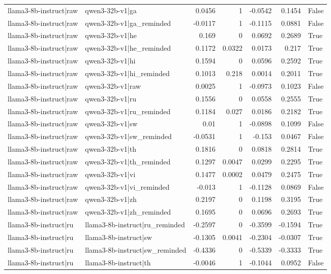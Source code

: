 \begin{table}
\begin{tabular}{l l r r r r l}
llama3-8b-instruct|raw & qwen3-32b-v1|ga & 0.0456 & 1 & -0.0542 & 0.1454 & False \\
llama3-8b-instruct|raw & qwen3-32b-v1|ga_reminded & -0.0117 & 1 & -0.1115 & 0.0881 & False \\
llama3-8b-instruct|raw & qwen3-32b-v1|he & 0.169 & 0 & 0.0692 & 0.2689 & True \\
llama3-8b-instruct|raw & qwen3-32b-v1|he_reminded & 0.1172 & 0.0322 & 0.0173 & 0.217 & True \\
llama3-8b-instruct|raw & qwen3-32b-v1|hi & 0.1594 & 0 & 0.0596 & 0.2592 & True \\
llama3-8b-instruct|raw & qwen3-32b-v1|hi_reminded & 0.1013 & 0.218 & 0.0014 & 0.2011 & True \\
llama3-8b-instruct|raw & qwen3-32b-v1|raw & 0.0025 & 1 & -0.0973 & 0.1023 & False \\
llama3-8b-instruct|raw & qwen3-32b-v1|ru & 0.1556 & 0 & 0.0558 & 0.2555 & True \\
llama3-8b-instruct|raw & qwen3-32b-v1|ru_reminded & 0.1184 & 0.027 & 0.0186 & 0.2182 & True \\
llama3-8b-instruct|raw & qwen3-32b-v1|sw & 0.01 & 1 & -0.0898 & 0.1099 & False \\
llama3-8b-instruct|raw & qwen3-32b-v1|sw_reminded & -0.0531 & 1 & -0.153 & 0.0467 & False \\
llama3-8b-instruct|raw & qwen3-32b-v1|th & 0.1816 & 0 & 0.0818 & 0.2814 & True \\
llama3-8b-instruct|raw & qwen3-32b-v1|th_reminded & 0.1297 & 0.0047 & 0.0299 & 0.2295 & True \\
llama3-8b-instruct|raw & qwen3-32b-v1|vi & 0.1477 & 0.0002 & 0.0479 & 0.2475 & True \\
llama3-8b-instruct|raw & qwen3-32b-v1|vi_reminded & -0.013 & 1 & -0.1128 & 0.0869 & False \\
llama3-8b-instruct|raw & qwen3-32b-v1|zh & 0.2197 & 0 & 0.1198 & 0.3195 & True \\
llama3-8b-instruct|raw & qwen3-32b-v1|zh_reminded & 0.1695 & 0 & 0.0696 & 0.2693 & True \\
llama3-8b-instruct|ru & llama3-8b-instruct|ru_reminded & -0.2597 & 0 & -0.3599 & -0.1594 & True \\
llama3-8b-instruct|ru & llama3-8b-instruct|sw & -0.1305 & 0.0041 & -0.2304 & -0.0307 & True \\
llama3-8b-instruct|ru & llama3-8b-instruct|sw_reminded & -0.4336 & 0 & -0.5339 & -0.3333 & True \\
llama3-8b-instruct|ru & llama3-8b-instruct|th & -0.0046 & 1 & -0.1044 & 0.0952 & False \\

\end{tabular}
\end{table}
